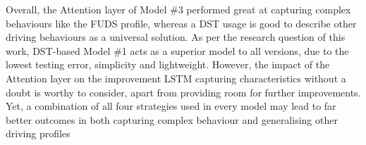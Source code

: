 %
%
Overall, the Attention layer of Model \#3 performed great at capturing complex behaviours like the FUDS profile, whereas a DST usage is good to describe other driving behaviours as a universal solution.
As per the research question of this work, DST-based Model \#1 acts as a superior model to all versions, due to the lowest testing error, simplicity and lightweight.
However, the impact of the Attention layer on the improvement LSTM capturing characteristics without a doubt is worthy to consider, apart from providing room for further improvements.
Yet, a combination of all four strategies used in every model may lead to far better outcomes in both capturing complex behaviour and generalising other driving profiles

%
%

%
%

%

%
%

